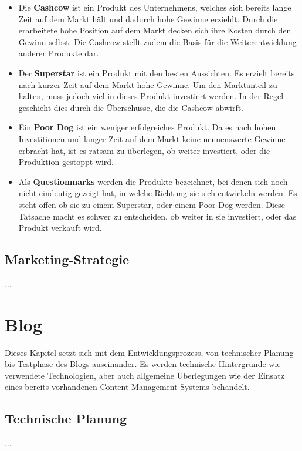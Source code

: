   \begin{itemize}
    \item Die \textbf{Cashcow} ist ein Produkt des Unternehmens, welches sich bereits lange Zeit auf dem Markt hält und dadurch hohe Gewinne erziehlt. Durch die
    erarbeitete hohe Position auf dem Markt decken sich ihre Kosten durch den Gewinn selbst. Die Cashcow stellt zudem die Basis für die Weiterentwicklung anderer
    Produkte dar.

    \item Der \textbf{Superstar} ist ein Produkt mit den besten Aussichten. Es erzielt bereits nach kurzer Zeit auf dem Markt hohe Gewinne. Um den Marktanteil
    zu halten, muss jedoch viel in dieses Produkt investiert werden. In der Regel geschieht dies durch die Überschüsse, die die Cashcow abwirft.

    \item Ein \textbf{Poor Dog} ist ein weniger erfolgreiches Produkt. Da es nach hohen Investitionen und langer Zeit auf dem Markt keine nennenswerte
    Gewinne erbracht hat, ist es ratsam zu überlegen, ob weiter investiert, oder die Produktion gestoppt wird.

    \item Als \textbf{Questionmarks} werden die Produkte bezeichnet, bei denen sich noch nicht eindeutig gezeigt hat, in welche Richtung sie sich entwickeln werden.
    Es steht offen ob sie zu einem Superstar, oder einem Poor Dog werden. Diese Tatsache macht es schwer zu entscheiden, ob weiter in sie investiert, oder das Produkt
    verkauft wird.
  \end{itemize}

  \subsection{Marketing-Strategie}
  ...
\section{Blog}
Dieses Kapitel setzt sich mit dem Entwicklungsprozess, von technischer Planung bis Testphase
des Blogs auseinander. Es werden technische Hintergründe wie verwendete Technologien, aber
auch allgemeine Überlegungen wie der Einsatz eines bereits vorhandenen Content Management Systems
behandelt.

  \subsection{Technische Planung}
  ...

